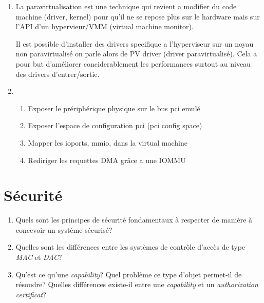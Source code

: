 \begin{correction}

\begin{enumerate}
  \item
        La paravirtualisation est une technique qui revient a modifier du code
        machine (driver, kernel) pour qu'il ne se repose plus sur le hardware
        mais sur l'API d'un hypervieur/VMM (virtual machine monitor).

        Il est possible d'installer des drivers specifique a l'hyperviseur sur
        un noyau non paravirtualis\'e on parle alors de PV driver (driver
        paravirtualis\'e). Cela a pour but d'am\'eliorer conciderablement les
        performances surtout au niveau des drivers d'entrer/sortie.
  \item
       \begin{enumerate}
       \item Exposer le pr\'eriph\'erique physique sur le bus pci emul\'e
       \item Exposer l'espace de configuration pci (pci config space)
       \item Mapper les ioports, mmio, dans la virtual machine
       \item Rediriger les requettes DMA gr\^ace a une IOMMU
       \end{enumerate}
\end{enumerate}

\end{correction}

% 
%

\section{S\'ecurit\'e
         }

\begin{enumerate}
  \item
    Quels sont les principes de s\'ecurit\'e fondamentaux \`a respecter
    de mani\`ere \`a concevoir un syst\`eme s\'ecuris\'e?
  \item
    Quelles sont les diff\'erences entre les syst\`emes de contr\^ole d'acc\`es
    de type \textit{MAC} et \textit{DAC}?
  \item
    Qu'est ce qu'une \textit{capability}? Quel probl\`eme ce type d'objet
    permet-il de r\'esoudre? Quelles diff\'erences existe-il entre une
    \textit{capability} et un \textit{authorization certificat}?
\end{enumerate}

